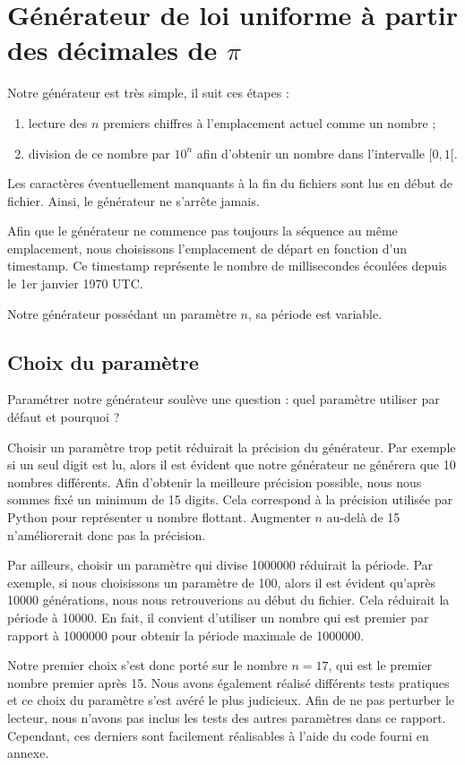 \documentclass[10pt,a4paper]{article}
\begin{document}
	\newpage
	\section{Générateur de loi uniforme à partir des décimales de $\pi$}
	Notre générateur est très simple, il suit ces étapes :
	\begin{enumerate}
		\item lecture des $n$ premiers chiffres à l'emplacement actuel comme un nombre ;
		\item division de ce nombre par $10^{n}$ afin d'obtenir un nombre dans l'intervalle $[0, 1[$.
	\end{enumerate}
	Les caractères éventuellement manquants à la fin du fichiers sont lus en début de fichier. Ainsi, le générateur ne s'arrête jamais.
	
	Afin que le générateur ne commence pas toujours la séquence au même emplacement, nous choisissons l'emplacement de départ en fonction d'un timestamp.
	Ce timestamp représente le nombre de millisecondes écoulées depuis le 1er janvier 1970 UTC.
	
	Notre générateur possédant un paramètre $n$, sa période est variable.
	
	\subsection{Choix du paramètre}
	Paramétrer notre générateur soulève une question : quel paramètre utiliser par défaut et pourquoi ?
	
	Choisir un paramètre trop petit réduirait la précision du générateur.
	Par exemple si un seul digit est lu, alors il est évident que notre générateur ne générera que 10 nombres différents.
	Afin d'obtenir la meilleure précision possible, nous nous sommes fixé un minimum de 15 digits.
	Cela correspond à la précision utilisée par Python pour représenter u nombre flottant.
	Augmenter $n$ au-delà de 15 n'améliorerait donc pas la précision.
	
	Par ailleurs, choisir un paramètre qui divise 1000000 réduirait la période.
	Par exemple, si nous choisissons un paramètre de 100, alors il est évident qu'après 10000 générations, nous nous retrouverions au début du fichier.
	Cela réduirait la période à 10000.
	En fait, il convient d'utiliser un nombre qui est premier par rapport à 1000000 pour obtenir la période maximale de 1000000.
	
	Notre premier choix s'est donc porté sur le nombre $n = 17$, qui est le premier nombre premier après 15.
	Nous avons également réalisé différents tests pratiques et ce choix du paramètre s'est avéré le plus judicieux.
	Afin de ne pas perturber le lecteur, nous n'avons pas inclus les tests des autres paramètres dans ce rapport.
	Cependant, ces derniers sont facilement réalisables à l'aide du code fourni en annexe.
	
\end{document}
